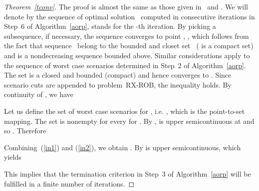 \documentclass[11pt]{article}
\begin{document}
\begin{proof}[Theorem~\ref{tconv}]
The proof is almost the same as those given in~\cite[Theorem~2.5]{G72} and \cite[Theorem~3]{SA80}.
We will denote by  the sequence of optimal solution~
computed in consecutive  iterations in Step~6 of Algorithm~\ref{aorp},
  stands for the  -th iteration.
 By picking a subsequence, if necessary, the sequence 
converges to point , , which 
follows from the fact that sequence~ belong to the bounded and closet
 set~ ( is a compact set) and
 is a nondecreasing sequence bounded above. Similar considerations apply to the 
sequence  of worst case scenarios determined in Step~2 of Algorithm~\ref{aorp}.
 The set  is
a closed and bounded (compact) and hence    converges to .
Since scenario cuts are appended to  problem~\textsc{RX-ROB}, the inequality 
 holds. By continuity of ,
we have

Let us define the set  of worst case scenarios for , i.e.
, which is
the point-to-set mapping. The set  is nonempty for every for .
By \cite[Theorem~1.5]{M70},  is upper semicontinuous at 
and so . Therefore 

Combining~(\ref{in1}) and (\ref{in2}), we obtain .
By \cite[Lemma~1.2]{M70}  is upper semicontinuous, which  yields

This implies that the termination criterion in Step~3 of Algorithm~\ref{aorp} will be  fulfilled in a finite number of iterations.
\end{proof}
\end{document}
